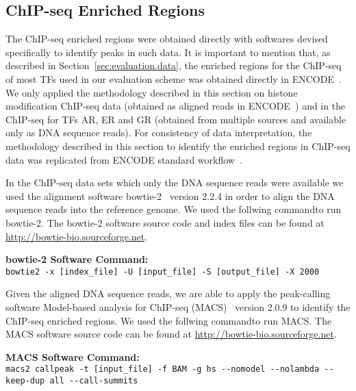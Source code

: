 \subsection{ChIP-seq Enriched Regions}
\label{sec:chipseq.enriched.regions}

The ChIP-seq enriched regions were obtained directly with softwares devised specifically to identify peaks in such data. It is important to mention that, as described in Section~\ref{sec:evaluation.data}, the enriched regions for the ChIP-seq of most TFs used in our evaluation scheme was obtained directly in ENCODE~\cite{encode2012}. We only applied the methodology described in this section on histone modification ChIP-seq data (obtained as aligned reads in ENCODE~\cite{encode2012}) and in the ChIP-seq for TFs AR, ER and GR (obtained from multiple sources and available only as DNA sequence reads). For consistency of data interpretation, the methodology described in this section to identify the enriched regions in ChIP-seq data was replicated from ENCODE standard workflow~\cite{encode2012}.

In the ChIP-seq data sets which only the DNA sequence reads were available we used the alignment software bowtie-2~\cite{langmead2012} version 2.2.4 in order to align the DNA sequence reads into the reference genome. We used the follwing commandto run bowtie-2. The bowtie-2 software source code and index files can be found at \url{http://bowtie-bio.sourceforge.net}.

\vspace{0.3cm}
\noindent
\textbf{bowtie-2 Software Command:}\\
\texttt{bowtie2 -x [index\_file] -U [input\_file] -S [output\_file] -X 2000}
\vspace{0.3cm}

Given the aligned DNA sequence reads, we are able to apply the peak-calling software Model-based analysis for ChIP-seq (MACS)~\cite{zhang2008} version 2.0.9 to identify the ChIP-seq enriched regions. We used the follwing commandto run MACS. The MACS software source code can be found at \url{http://bowtie-bio.sourceforge.net}.

\vspace{0.3cm}
\noindent
\textbf{MACS Software Command:}\\
\texttt{macs2 callpeak -t [input\_file] -f BAM -g hs -{}-nomodel -{}-nolambda -{}-keep-dup all -{}-call-summits}
\vspace{0.3cm}

